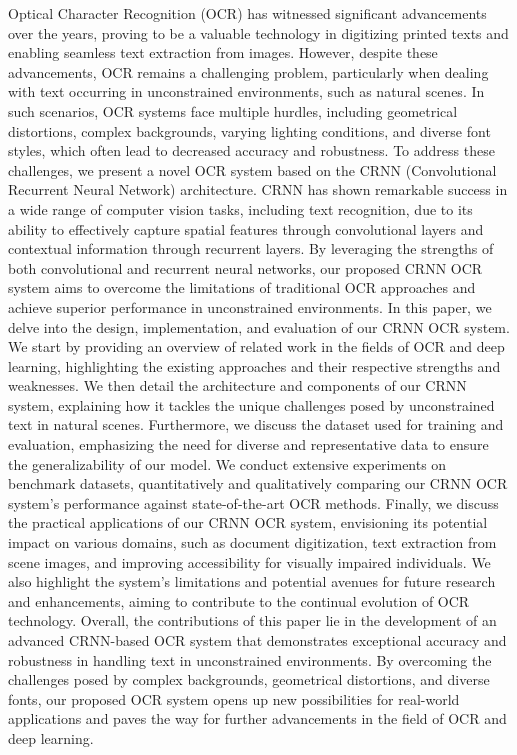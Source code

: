 \documentclass[10pt,twocolumn,letterpaper]{article}
\begin{document}
Optical Character Recognition (OCR) has witnessed significant advancements over the years, proving to be a valuable technology in digitizing printed texts and enabling seamless text extraction from images. However, despite these advancements, OCR remains a challenging problem, particularly when dealing with text occurring in unconstrained environments, such as natural scenes. In such scenarios, OCR systems face multiple hurdles, including geometrical distortions, complex backgrounds, varying lighting conditions, and diverse font styles, which often lead to decreased accuracy and robustness. To address these challenges, we present a novel OCR system based on the CRNN (Convolutional Recurrent Neural Network) architecture. CRNN has shown remarkable success in a wide range of computer vision tasks, including text recognition, due to its ability to effectively capture spatial features through convolutional layers and contextual information through recurrent layers. By leveraging the strengths of both convolutional and recurrent neural networks, our proposed CRNN OCR system aims to overcome the limitations of traditional OCR approaches and achieve superior performance in unconstrained environments. In this paper, we delve into the design, implementation, and evaluation of our CRNN OCR system. We start by providing an overview of related work in the fields of OCR and deep learning, highlighting the existing approaches and their respective strengths and weaknesses. We then detail the architecture and components of our CRNN system, explaining how it tackles the unique challenges posed by unconstrained text in natural scenes. Furthermore, we discuss the dataset used for training and evaluation, emphasizing the need for diverse and representative data to ensure the generalizability of our model. We conduct extensive experiments on benchmark datasets, quantitatively and qualitatively comparing our CRNN OCR system's performance against state-of-the-art OCR methods. Finally, we discuss the practical applications of our CRNN OCR system, envisioning its potential impact on various domains, such as document digitization, text extraction from scene images, and improving accessibility for visually impaired individuals. We also highlight the system's limitations and potential avenues for future research and enhancements, aiming to contribute to the continual evolution of OCR technology. Overall, the contributions of this paper lie in the development of an advanced CRNN-based OCR system that demonstrates exceptional accuracy and robustness in handling text in unconstrained environments. By overcoming the challenges posed by complex backgrounds, geometrical distortions, and diverse fonts, our proposed OCR system opens up new possibilities for real-world applications and paves the way for further advancements in the field of OCR and deep learning.
\end{document}
